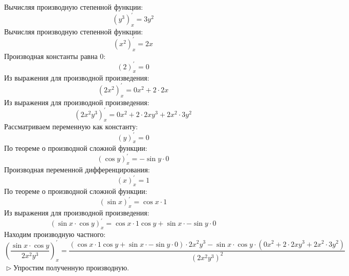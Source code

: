 \documentclass[12pt]{article}
\begin{document}
Вычисляя производную степенной функции:
\begin{dmath*}
\left(y^{3}\right)_{x}^{\prime} = 3y^{2}
\end{dmath*}Вычисляя производную степенной функции:
\begin{dmath*}
\left(x^{2}\right)_{x}^{\prime} = 2x
\end{dmath*}Производная константы равна 0:
\begin{dmath*}
\left(2\right)_{x}^{\prime} = 0
\end{dmath*}Из выражения для производной произведения:
\begin{dmath*}
\left(2x^{2}\right)_{x}^{\prime} = 0x^{2} + 2 \cdot 2x
\end{dmath*}Из выражения для производной произведения:
\begin{dmath*}
\left(2x^{2}y^{3}\right)_{x}^{\prime} = 0x^{2} + 2 \cdot 2xy^{3} + 2x^{2} \cdot 3y^{2}
\end{dmath*}Рассматриваем переменную как константу:
\begin{dmath*}
\left(y\right)_{x}^{\prime} = 0
\end{dmath*}По теореме о производной сложной функции:
\begin{dmath*}
\left(\cos y\right)_{x}^{\prime} = -\sin y \cdot 0
\end{dmath*}Производная переменной дифференцирования:
\begin{dmath*}
\left(x\right)_{x}^{\prime} = 1
\end{dmath*}По теореме о производной сложной функции:
\begin{dmath*}
\left(\sin x\right)_{x}^{\prime} = \cos x \cdot 1
\end{dmath*}Из выражения для производной произведения:
\begin{dmath*}
\left(\sin x \cdot \cos y\right)_{x}^{\prime} = \cos x \cdot 1\cos y + \sin x \cdot -\sin y \cdot 0
\end{dmath*}Находим производную частного:
\begin{dmath*}
\left( \frac {\sin x \cdot \cos y} {2x^{2}y^{3}} \right)_{x}^{\prime} =  \frac {\left(\cos x \cdot 1\cos y + \sin x \cdot -\sin y \cdot 0\right) \cdot 2x^{2}y^{3} - \sin x \cdot \cos y \cdot \left(0x^{2} + 2 \cdot 2xy^{3} + 2x^{2} \cdot 3y^{2}\right)} {\left(2x^{2}y^{3}\right)^{2}} 
\end{dmath*}$\vartriangleright$Упростим полученную производную.
\end{document}
